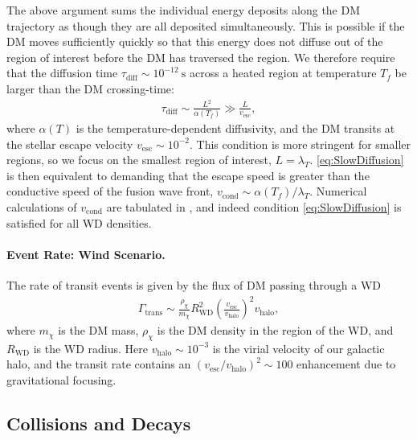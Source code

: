 \documentclass[preprintnumbers,amsmath,amssymb,prd,superscriptaddress]{revtex4}
\def\r{\right)}
\def\l{\left(}
\begin{document}
The above argument sums the individual energy deposits along the DM trajectory as though they are all deposited simultaneously.
This is possible if the DM moves sufficiently quickly so that this energy does not diffuse out of the region of interest before the DM has traversed the region.
We therefore require that the diffusion time $\tau_\text{diff} \sim 10^{-12} ~\text{s}$ across a heated region at temperature $T_f$ be larger than the DM crossing-time:
\begin{align}
  \tau_\text{diff} \sim \frac{L^2}{\alpha(T_f)} \gg
  \frac{L}{v_\text{esc}},
\label{eq:SlowDiffusion}
\end{align}
where $\alpha(T)$ is the temperature-dependent diffusivity, and the DM transits at the stellar escape velocity $v_\text{esc} \sim 10^{-2}$.
This condition is more stringent for smaller regions, so we focus on the smallest region of interest, $L = \lambda_T$.
\eqref{eq:SlowDiffusion} is then equivalent to demanding that the escape speed is greater than the conductive speed of the fusion wave front, $v_\text{cond} \sim \alpha(T_f) / \lambda_T$.
Numerical calculations of $v_\text{cond}$ are tabulated in \cite{Woosley}, and indeed condition \eqref{eq:SlowDiffusion} is satisfied for all WD densities.

\paragraph{Event Rate: Wind Scenario.}
The rate of transit events is given by the flux of DM passing through a WD
\begin{align}
  \Gamma_\text{trans} \sim
  \frac{\rho_{\chi}}{m_\chi} R_\text{WD}^2
  \l\frac{v_\text{esc}}{v_\text{halo}}\r^2 v_\text{halo},
\label{eq:TransitFluxCondition}
\end{align}
where $m_\chi$ is the DM mass, $\rho_\chi$ is the DM density in the region of the WD, and $R_\text{WD}$ is the WD radius.
Here $v_\text{halo} \sim 10^{-3}$ is the virial velocity of our galactic halo, and the transit rate contains an $(v_\text{esc}/v_\text{halo})^2 \sim 100$ enhancement due to gravitational focusing.

\subsection{Collisions and Decays}
\end{document}

